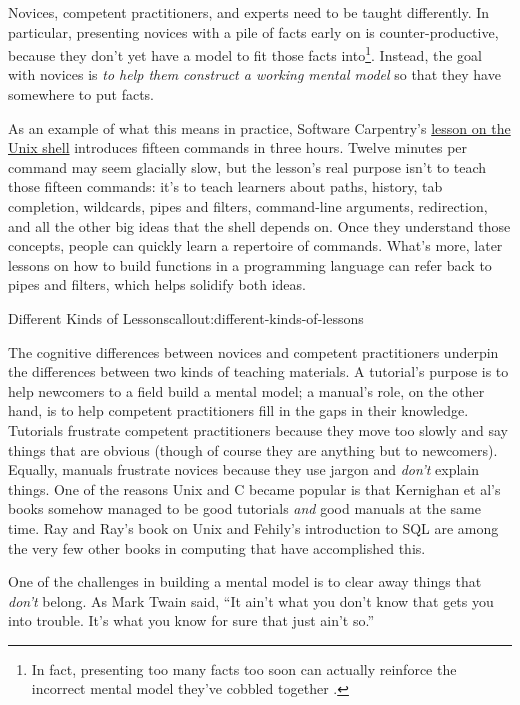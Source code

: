 Novices, competent practitioners, and experts need to be taught
differently.  In particular, presenting novices with a pile of facts
early on is counter-productive, because they don't yet have a model to
fit those facts into\footnote{In fact, presenting too many facts too
soon can actually reinforce the incorrect mental model they've cobbled
together \cite{}.}. Instead, the goal with novices is \emph{to help
them construct a working mental model} so that they have somewhere to
put facts.

As an example of what this means in practice, Software Carpentry's
\href{http://swcarpentry.github.io/shell-novice/}{lesson on the Unix
shell} introduces fifteen commands in three hours. Twelve minutes per
command may seem glacially slow, but the lesson's real purpose isn't
to teach those fifteen commands: it's to teach learners about paths,
history, tab completion, wildcards, pipes and filters, command-line
arguments, redirection, and all the other big ideas that the shell
depends on.  Once they understand those concepts, people can quickly
learn a repertoire of commands.  What's more, later lessons on how to
build functions in a programming language can refer back to pipes and
filters, which helps solidify both ideas.

\begin{callout}{Different Kinds of Lessons}{callout:different-kinds-of-lessons}

The cognitive differences between novices and competent practitioners
underpin the differences between two kinds of teaching materials. A
tutorial's purpose is to help newcomers to a field build a mental model;
a manual's role, on the other hand, is to help competent practitioners
fill in the gaps in their knowledge. Tutorials frustrate competent
practitioners because they move too slowly and say things that are
obvious (though of course they are anything but to newcomers). Equally,
manuals frustrate novices because they use jargon and \emph{don't}
explain things. One of the reasons Unix and C became popular is that
Kernighan et al's books \cite{fixme} somehow managed to be good tutorials
\emph{and} good manuals at the same time. Ray and Ray's book on Unix \cite{fixme}
and Fehily's introduction to SQL \cite{fixme} are among the very few
other books in computing that have accomplished this.

\end{callout}

One of the challenges in building a mental model is to clear away
things that \emph{don't} belong.  As Mark Twain said, ``It ain't what
you don't know that gets you into trouble. It's what you know for sure
that just ain't so.''

